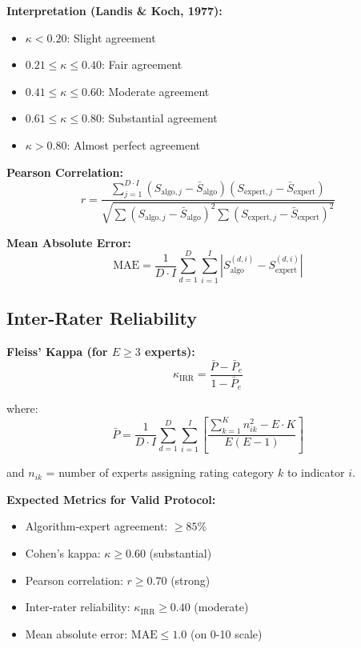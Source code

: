 \documentclass[11pt]{article}
\begin{document}
\textbf{Interpretation (Landis \& Koch, 1977):}
\begin{itemize}[noitemsep]
    \item $\kappa < 0.20$: Slight agreement
    \item $0.21 \leq \kappa \leq 0.40$: Fair agreement
    \item $0.41 \leq \kappa \leq 0.60$: Moderate agreement
    \item $0.61 \leq \kappa \leq 0.80$: Substantial agreement
    \item $\kappa > 0.80$: Almost perfect agreement
\end{itemize}

\textbf{Pearson Correlation:}
\begin{equation}
r = \frac{\sum_{j=1}^{D \cdot I} (S_{\text{algo},j} - \bar{S}_{\text{algo}})(S_{\text{expert},j} - \bar{S}_{\text{expert}})}{\sqrt{\sum (S_{\text{algo},j} - \bar{S}_{\text{algo}})^2 \sum (S_{\text{expert},j} - \bar{S}_{\text{expert}})^2}}
\end{equation}

\textbf{Mean Absolute Error:}
\begin{equation}
\text{MAE} = \frac{1}{D \cdot I} \sum_{d=1}^{D} \sum_{i=1}^{I} \left|S_{\text{algo}}^{(d,i)} - S_{\text{expert}}^{(d,i)}\right|
\end{equation}

\subsection{Inter-Rater Reliability}

\textbf{Fleiss' Kappa (for $E \geq 3$ experts):}
\begin{equation}
\kappa_{\text{IRR}} = \frac{\bar{P} - \bar{P}_e}{1 - \bar{P}_e}
\end{equation}

where:
\begin{equation}
\bar{P} = \frac{1}{D \cdot I} \sum_{d=1}^{D} \sum_{i=1}^{I} \left[\frac{\sum_{k=1}^{K} n_{ik}^2 - E \cdot K}{E(E-1)}\right]
\end{equation}

and $n_{ik}$ = number of experts assigning rating category $k$ to indicator $i$.

\textbf{Expected Metrics for Valid Protocol:}
\begin{itemize}[noitemsep]
    \item Algorithm-expert agreement: $\geq 85\%$
    \item Cohen's kappa: $\kappa \geq 0.60$ (substantial)
    \item Pearson correlation: $r \geq 0.70$ (strong)
    \item Inter-rater reliability: $\kappa_{\text{IRR}} \geq 0.40$ (moderate)
    \item Mean absolute error: $\text{MAE} \leq 1.0$ (on 0-10 scale)
\end{itemize}
\end{document}
